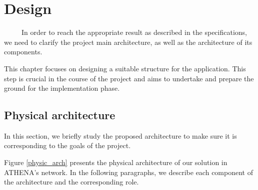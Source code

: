 
\chapter{Design}
\renewcommand{\chaptername}{Chapter}


~~~~~In order to reach the appropriate result as described in the specifications, we need to clarify the
project main architecture, as well as the architecture of its components.

This chapter focuses on designing a suitable structure for the application. This step is crucial in the course of the project and aims to undertake and prepare the ground for the implementation phase.

\section{Physical architecture}
In this section, we briefly study the proposed architecture to make sure it is corresponding to the goals of the project.

Figure \ref{physic_arch} presents the physical architecture of our solution in ATHENA's network. In the following paragraphs, we describe each component of the architecture and the corresponding role.

